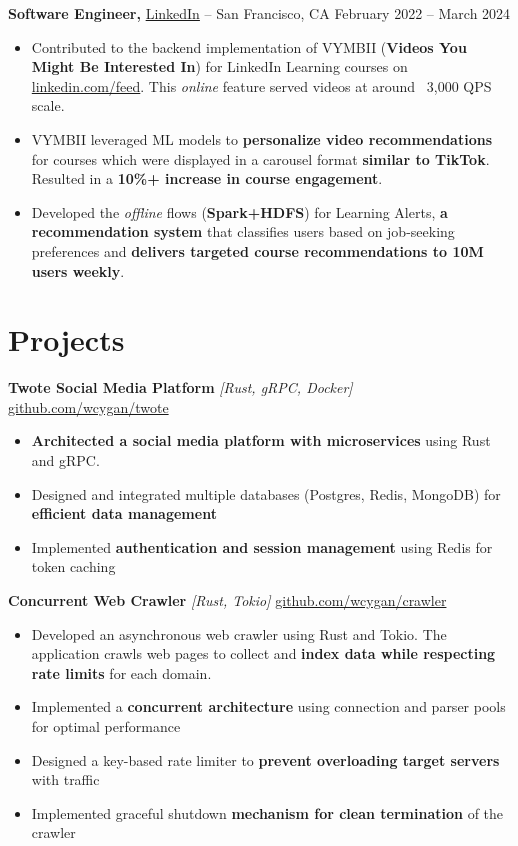 \documentclass[10pt]{article}
\begin{document}
\textbf{Software Engineer,} \href{https://www.linkedin.com/}{LinkedIn} -- San Francisco, CA \hfill February 2022 -- March 2024
\vspace{-4pt}
\begin{itemize}
  \item Contributed to the backend implementation of VYMBII (\textbf{Videos You Might Be Interested In}) for LinkedIn Learning courses on \href{https://linkedin.com/feed}{linkedin.com/feed}. This \textit{online} feature served videos at around ~3,000 QPS scale.
  \item VYMBII leveraged ML models to \textbf{personalize video recommendations} for courses which were displayed in a carousel format \textbf{similar to TikTok}. Resulted in a \textbf{10\%+ increase in course engagement}.
  \item Developed the \textit{offline} flows (\textbf{Spark+HDFS}) for Learning Alerts, \textbf{a recommendation system} that classifies users based on job-seeking preferences and \textbf{delivers targeted course recommendations to 10M users weekly}. 
\end{itemize}

\vspace{5pt}

\section*{Projects}
\vspace{4pt}
\textbf{Twote Social Media Platform} \textit{[Rust, gRPC, Docker]} \hfill \href{https://github.com/wcygan/twote}{github.com/wcygan/twote}
\vspace{-4pt}
\begin{itemize}
  \item \textbf{Architected a social media platform with microservices} using Rust and gRPC.
  \item Designed and integrated multiple databases (Postgres, Redis, MongoDB) for \textbf{efficient data management}
  \item Implemented \textbf{authentication and session management} using Redis for token caching
\end{itemize}

\textbf{Concurrent Web Crawler} \textit{[Rust, Tokio]} \hfill \href{https://github.com/wcygan/crawler}{github.com/wcygan/crawler}
\vspace{-4pt}
\begin{itemize}
  \item Developed an asynchronous web crawler using Rust and Tokio. The application crawls web pages to collect and \textbf{index data while respecting rate limits} for each domain.
  \item Implemented a \textbf{concurrent architecture} using connection and parser pools for optimal performance
  \item Designed a key-based rate limiter to \textbf{prevent overloading target servers} with traffic
  \item Implemented graceful shutdown \textbf{mechanism for clean termination} of the crawler
\end{itemize}
\end{document}
